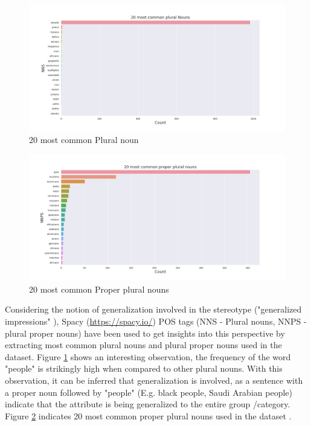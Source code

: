 \begin{figure}[h!]
    \centering
    \includegraphics[width=1\textwidth]{thesis/figures/20 most common plural Nouns.png}
    \caption{20 most common Plural noun}
    \label{fig:plural_nouns}
\end{figure}

\begin{figure}[h!]
    \centering
    \includegraphics[width=1\textwidth]{thesis/figures/20 most common proper plural nouns.png}
    \caption{20 most common Proper plural nouns}
    \label{fig:Proper_plural_nouns}
\end{figure}
Considering the notion of generalization involved in the stereotype ("generalized impressions" \cite{burgers2020language}), Spacy (\url{https://spacy.io/}) POS tags (NNS - Plural nouns, NNPS - plural proper nouns) have been used to get insights into this perspective by extracting most common plural nouns and plural proper nouns used in the dataset. Figure \ref{fig:plural_nouns} shows an interesting observation, the frequency of the word "people" is strikingly high when compared to other plural nouns. With this observation, it can be inferred that generalization is involved, as a sentence with a proper noun followed by "people" (E.g. black people, Saudi Arabian people) indicate that the attribute is being generalized to the entire group /category. Figure \ref{fig:Proper_plural_nouns} indicates 20 most common proper plural nouns used in the dataset .

